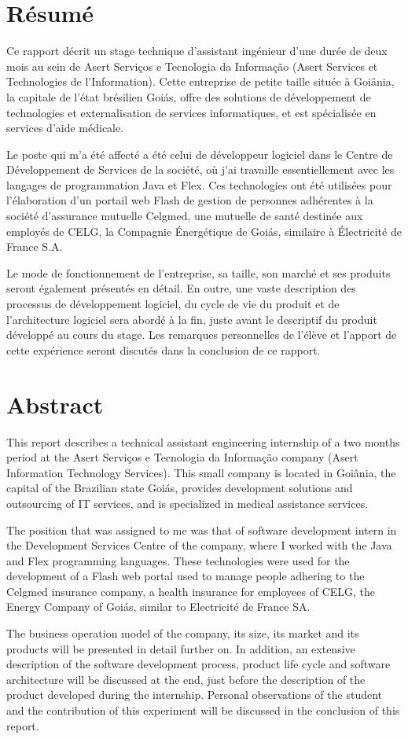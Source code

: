 \chapter*{Résumé}

Ce rapport décrit un stage technique d'assistant ingénieur d'une durée de deux mois au sein de Asert Serviços e Tecnologia da Informação (Asert Services et Technologies de l'Information). Cette entreprise de petite taille située à Goiânia, la capitale de l'état brésilien Goiás, offre des solutions de développement de technologies et externalisation de services informatiques, et est spécialisée en services d'aide médicale. 

Le poste qui m'a été affecté a été celui de développeur logiciel dans le Centre de Développement de Services de la société, où j'ai travaille essentiellement avec les langages de programmation Java et Flex. Ces technologies ont été utilisées pour l'élaboration d'un portail web Flash de gestion de personnes adhérentes à la société d'assurance mutuelle Celgmed, une mutuelle de santé destinée aux employés de CELG, la Compagnie Énergétique de Goiás, similaire à Électricité de France S.A.

Le mode de fonctionnement de l'entreprise, sa taille, son marché et ses produits seront également présentés en détail. En outre, une vaste description des processus de développement logiciel, du cycle de vie du produit et de l'architecture logiciel sera abordé à la fin, juste avant le descriptif du produit développé au cours du stage. Les remarques personnelles de l'élève et l'apport de cette expérience seront discutés dans la conclusion de ce rapport.


\chapter*{Abstract}

This report describes a technical assistant engineering internship of a two months period at the Asert Serviços e Tecnologia da Informação company (Asert Information Technology Services). This small company is located in Goiânia, the capital of the Brazilian state Goiás, provides development solutions and outsourcing of IT services, and is specialized in medical assistance services.

The position that was assigned to me was that of software development intern in the Development Services Centre of the company, where I worked with the Java and Flex programming languages. These technologies were used for the development of a Flash web portal used to manage people adhering to the Celgmed insurance company, a health insurance for employees of CELG, the Energy Company of Goiás, similar to Electricité de France SA.

The business operation model of the company, its size, its market and its products will be presented in detail further on. In addition, an extensive description of the software development process, product life cycle and software architecture will be discussed at the end, just before the description of the product developed during the internship. Personal observations of the student and the contribution of this experiment will be discussed in the conclusion of this report.